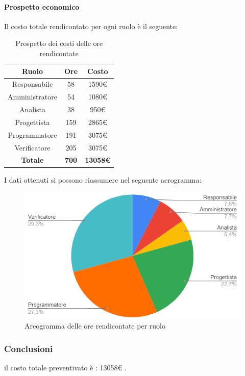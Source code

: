 \paragraph{Prospetto economico}
Il costo totale rendicontato per ogni ruolo è il seguente:
\begin{table}[H]
		\begin{center}
			\setlength{\aboverulesep}{0pt}
			\setlength{\belowrulesep}{0pt}
			\setlength{\extrarowheight}{.75ex}
			\begin{tabular}{ c c c }
				\rowcolor{AzzurroGruppo!30} 
				\textbf{Ruolo} & \textbf{Ore} & \textbf{Costo}  \\
				\toprule
				Responsabile   & 58 & 1590€ \\
				Amministratore & 54 & 1080€ \\
				Analista       & 38 & 950€ \\
				Progettista    & 159 & 2865€ \\
				Programmatore  & 191 & 3075€ \\
				Verificatore   & 205 & 3075€ \\
				\textbf{Totale} & \textbf{700} & \textbf{13058€} \\
				\bottomrule
			\end{tabular}
			\caption{Prospetto dei costi delle ore rendicontate}
		\end{center}
	\end{table}
I dati ottenuti si possono riassumere nel seguente aerogramma:
\begin{figure}[H]
    \centering
    \includegraphics[scale = 0.5]{components/img/rendiconto_torta.png}
    \caption{Areogramma delle ore rendicontate per ruolo}
    \label{fig:logo}
\end{figure}
\subsubsection{Conclusioni}
il costo totale preventivato è : 13058€ .